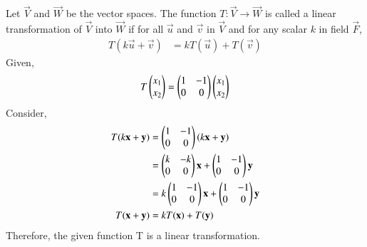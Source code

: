 Let $\vec{V}$ and $\vec{W}$ be the vector spaces.  The function $T : \vec{V} \rightarrow \vec{W}$ is called a linear transformation of $\vec{V}$ into $\vec{W}$ if for all $\vec{u}$ and $\vec{v}$ in $\vec{V}$ and for any scalar $k$ in field $\vec{F}$,
\begin{align}
	T(k\vec{u} + \vec{v}) &= kT(\vec{u}) + T(\vec{v})
\end{align}
Given, 
\begin{align}
	T \begin{pmatrix}x_1 \\x_2\end{pmatrix}  = \begin{pmatrix}1 & -1\\0 & 0\end{pmatrix} \begin{pmatrix}x_1 \\ x_2\end{pmatrix}
\end{align}
Consider,
\begin{align}
	T(k\mathbf{x} + \mathbf{y})  &= \begin{pmatrix}1  & -1\\0 & 0\end{pmatrix}\left(k\mathbf{x} + \mathbf{y}\right)\\
    &=\begin{pmatrix}k & -k\\0 &0\end{pmatrix}\mathbf{x} + \begin{pmatrix}1 & -1\\0 &0\end{pmatrix}\mathbf{y} \\
      &=k\begin{pmatrix}1 & -1\\0 &0\end{pmatrix}\mathbf{x} + \begin{pmatrix}1 & -1\\0 &0\end{pmatrix}\mathbf{y} \\
  T(\mathbf{x} + \mathbf{y})  &= kT(\mathbf{x}) + T(\mathbf{y})
\end{align}
Therefore, the given function T is a linear transformation.
